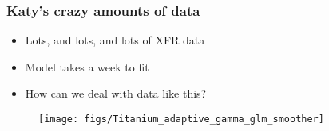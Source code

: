 \documentclass{beamer}
\begin{document}


\begin{frame}
    \frametitle{Katy's crazy amounts of data}
    \begin{itemize}
        \item Lots, and lots, and lots of XFR data
        \item Model takes a week to fit
        \item How can we deal with data like this?
    \end{itemize}
    \begin{figure}
        \center
        \texttt{[image: figs/Titanium\_adaptive\_gamma\_glm\_smoother]}
    \end{figure}
\end{frame}
\end{document}
